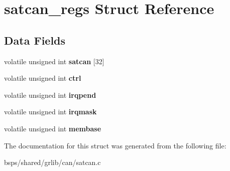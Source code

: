\hypertarget{structsatcan__regs}{}\section{satcan\+\_\+regs Struct Reference}
\label{structsatcan__regs}
\subsection*{Data Fields}
\begin{DoxyCompactItemize}
\item 
\mbox{\label{structsatcan__regs_ab135ecd58d8ca733453281639c9c9699}} 
volatile unsigned int {\bfseries satcan} \mbox{[}32\mbox{]}
\item 
\mbox{\label{structsatcan__regs_adb0d034757395f91489d7b555dd97f71}} 
volatile unsigned int {\bfseries ctrl}
\item 
\mbox{\label{structsatcan__regs_acdf1ea769767bec2fbb3d8265d33e43d}} 
volatile unsigned int {\bfseries irqpend}
\item 
\mbox{\label{structsatcan__regs_a89d917659cd7a86d998b511526eecce8}} 
volatile unsigned int {\bfseries irqmask}
\item 
\mbox{\label{structsatcan__regs_a9a7b8c86dc3d8bbf062dd6da4a37b9fc}} 
volatile unsigned int {\bfseries membase}
\end{DoxyCompactItemize}


The documentation for this struct was generated from the following file\+:\begin{DoxyCompactItemize}
\item 
bsps/shared/grlib/can/satcan.\+c\end{DoxyCompactItemize}
